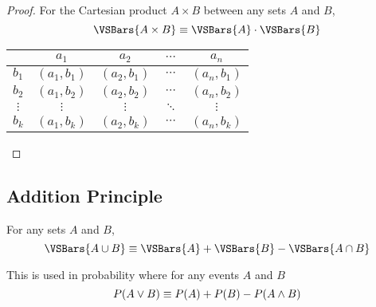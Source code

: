 \begin{proof}
    For the Cartesian product $A \times B$ between any sets $A$ and $B$,
    \begin{equation}
        \VSBars{A \times B} \equiv \VSBars{A} \cdot \VSBars{B}
    \end{equation}
    \begin{table}[H]
    \centering
    \begin{tabular}{@{}c | cccc@{}}
    \toprule
             & $a_1$        & $a_2$        & $\cdots$ & $a_n$        \\ 
    \midrule
    $b_1$    & $(a_1, b_1)$ & $(a_2, b_1)$ & $\cdots$ & $(a_n, b_1)$ \\
    $b_2$    & $(a_1, b_2)$ & $(a_2, b_2)$ & $\cdots$ & $(a_n, b_2)$ \\
    $\vdots$ & $\vdots$     & $\vdots$     & $\ddots$ & $\vdots$     \\
    $b_k$    & $(a_1, b_k)$ & $(a_2, b_k)$ & $\cdots$ & $(a_n, b_k)$ \\ 
    \bottomrule
    \end{tabular}
    \end{table}
\end{proof}

\subsection{Addition Principle}

\begin{definition}
    For any sets $A$ and $B$,
    \begin{equation}
        \VSBars{A \cup B} \equiv \VSBars{A} + \VSBars{B} - \VSBars{A \cap B}
    \end{equation}
\end{definition}

\begin{remark}
    This is used in probability where for any events $A$ and $B$
    \begin{equation}
        \relax{P}(A \lor B) \equiv \relax{P}(A) + \relax{P}(B) - \relax{P}(A \land B)
    \end{equation}
\end{remark}
